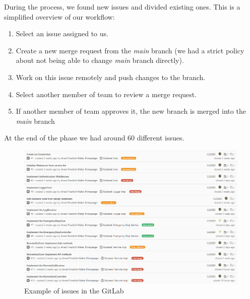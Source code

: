 During the process, we found new issues and divided existing ones. This is a simplified overview of our workflow:
\begin{enumerate}
    \item Select an issue assigned to us.
    \item Create a new merge request from the \textit{main} branch (we had a strict policy about not being able to change \textit{main} branch directly).
    \item Work on this issue remotely and push changes to the branch.
    \item Select another member of team to review a merge request.
    \item If another member of team approves it, the new branch is merged into the \textit{main} branch
\end{enumerate}
At the end of the phase we had around 60 different issues.

\begin{figure}[h]
    \caption{Example of issues in the GitLab}
    \centering
    \includegraphics[scale=0.65]{images/issues.png}
\end{figure}
